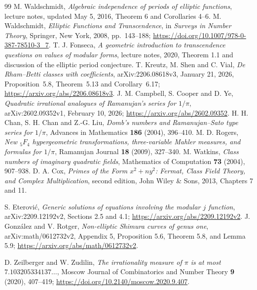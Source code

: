 \begin{thebibliography}{99}
 M. Waldschmidt,
\emph{Algebraic independence of periods of elliptic functions},
lecture notes, updated May 5, 2016, Theorem 6 and Corollaries 4--6.
 M. Waldschmidt,
\emph{Elliptic Functions and Transcendence}, in
\emph{Surveys in Number Theory}, Springer, New York, 2008,
pp.~143--188;
\url{https://doi.org/10.1007/978-0-387-78510-3_7}.
 T. J. Fonseca,
\emph{A geometric introduction to transcendence questions on values of
modular forms}, lecture notes, 2020, Theorem 1.1 and discussion of the
elliptic period conjecture.
 T. Kreutz, M. Shen and C. Vial,
\emph{De Rham--Betti classes with coefficients},
arXiv:2206.08618v3, January 21, 2026,
Proposition~5.8, Theorem~5.13 and Corollary~6.17;
\url{https://arxiv.org/abs/2206.08618v3}.
 J. M. Campbell, S. Cooper and D. Ye,
\emph{Quadratic irrational analogues of Ramanujan's series for $1/\pi$},
arXiv:2602.09352v1, February 10, 2026;
\url{https://arxiv.org/abs/2602.09352}.
 H. H. Chan, S. H. Chan and Z.-G. Liu,
\emph{Domb's numbers and Ramanujan--Sato type series for $1/\pi$},
Advances in Mathematics \textbf{186} (2004), 396--410.
 M. D. Rogers,
\emph{New ${}_5F_4$ hypergeometric transformations, three-variable
Mahler measures, and formulas for $1/\pi$},
Ramanujan Journal \textbf{18} (2009), 327--340.
 M. Watkins,
\emph{Class numbers of imaginary quadratic fields},
Mathematics of Computation \textbf{73} (2004), 907--938.
 D. A. Cox,
\emph{Primes of the Form $x^2+ny^2$: Fermat, Class Field Theory, and
Complex Multiplication}, second edition, John Wiley \& Sons, 2013,
Chapters 7 and 11.
 \raggedright S. Eterovi\'c,
\emph{Generic solutions of equations involving the modular $j$ function},
arXiv:2209.12192v2, Sections 2.5 and 4.1;
\url{https://arxiv.org/abs/2209.12192v2}.
 J. Gonz\'alez and V. Rotger,
\emph{Non-elliptic Shimura curves of genus one},
arXiv:math/0612732v2, Appendix 5, Proposition 5.6, Theorem 5.8,
and Lemma 5.9; \url{https://arxiv.org/abs/math/0612732v2}.


 D. Zeilberger and W. Zudilin,
\emph{The irrationality measure of $\pi$ is at most $7.103205334137\ldots$},
Moscow Journal of Combinatorics and Number Theory \textbf{9} (2020),
407--419; \url{https://doi.org/10.2140/moscow.2020.9.407}.



\end{thebibliography}
